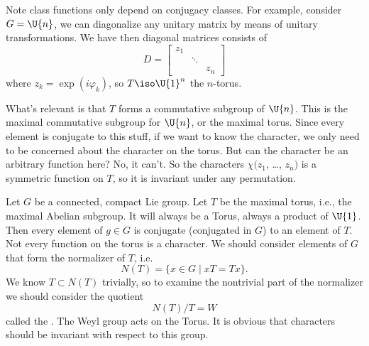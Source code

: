 Note class functions only depend on conjugacy classes. For
example, consider $G=\U{n}$, we can diagonalize any unitary
matrix by means of unitary transformations. We have then diagonal
matrices consists of
\begin{equation}
D = \begin{bmatrix}z_{1} & & \\
 & \ddots & \\
 &  & z_{n}
\end{bmatrix}
\end{equation}
where $z_{k}=\exp(i\varphi_{k})$, so $T\iso \U{1}^{n}$ the
$n$-torus.

What's relevant is that $T$ forms a commutative subgroup of
$\U{n}$. This is the maximal commutative subgroup for $\U{n}$, or
the maximal torus. Since every element is conjugate to this
stuff, if we want to know the character, we only need to be
concerned about the character on the torus. But can the character
be an arbitrary function here? No, it can't. So the characters
$\chi(z_{1}$, \dots, $z_{n})$ is a symmetric function on $T$, so it is
invariant under any permutation.

Let $G$ be a connected, compact Lie group. Let $T$ be the maximal
torus, i.e., the maximal Abelian subgroup. It will always be a
Torus, always a product of $\U{1}$. Then every element of $g\in
G$ is conjugate (conjugated in $G$) to an element of $T$. Not
every function on the torus is a character. We should consider
elements of $G$ that form the normalizer of $T$, i.e.
\begin{equation}
N(T) = \{x\in G\mid xT=Tx\}.
\end{equation}
We know $T\subset N(T)$ trivially, so to examine the nontrivial
part of the normalizer we should consider the quotient
\begin{equation}
N(T)/T = W
\end{equation}
called the . The Weyl group
acts on the Torus. It is obvious that characters should be
invariant with respect to this group.

